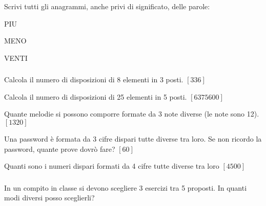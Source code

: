 \begin{esercizio}\label{P.3}
Scrivi tutti gli anagrammi, anche privi di significato, delle parole:
 \begin{enumeratea}
  \item PIU
  \item MENO
  \item VENTI
 \end{enumeratea}
\end{esercizio}

\subsubsection*{}

\begin{esercizio}\label{D.1}
Calcola il numero di disposizioni di 8 elementi in 3 posti.
\hfill $\left[336\right]$
\end{esercizio}

\begin{esercizio}\label{D.2}
Calcola il numero di disposizioni di 25 elementi in 5 posti.
\hfill $\left[6375600\right]$
\end{esercizio}

\begin{esercizio}\label{D.3}
Quante melodie si possono comporre formate da 3 note diverse (le note sono 12).
\hfill $\left[1320\right]$
\end{esercizio}

\begin{esercizio}\label{D.4}
Una password è formata da 3 cifre dispari tutte diverse tra loro. Se non ricordo la password, quante prove dovrò fare?
\hfill $\left[60\right]$
\end{esercizio}

\begin{esercizio}\label{D.5}
Quanti sono i numeri dispari formati da 4 cifre tutte diverse tra loro
\hfill $\left[4500\right]$
\end{esercizio}

\subsubsection*{}

\begin{esercizio}
\label{ese:C.1}
In un compito in classe si devono scegliere 3 esercizi tra 5 proposti. In quanti modi diversi posso sceglierli?
\end{esercizio}

